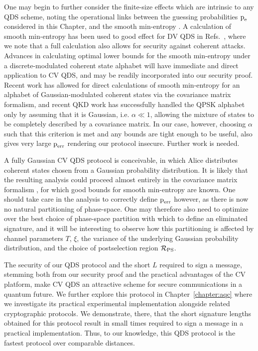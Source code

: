 One may begin to further consider the finite-size effects \cite{Tomamichel2016} which are intrinsic to any QDS scheme, noting the operational links between the guessing probabilities $\text{p}_{\text{e}}$ considered in this Chapter, and the smooth min-entropy \cite{Konig2009}. A calculation of smooth min-entropy has been used to good effect for DV QDS in Refs.~\cite{Amiri2016, Puthoor2016}, where we note that a full calculation also allows for security against coherent attacks. Advances in calculating optimal lower bounds for the smooth min-entropy under a discrete-modulated coherent state alphabet will have immediate and direct application to CV QDS, and may be readily incorporated into our security proof. Recent work \cite{Seshadreesan2017} has allowed for direct calculations of smooth min-entropy for an alphabet of Gaussian-modulated coherent states via the covariance matrix formalism, and recent QKD work \cite{Ghorai2019, Lin2019} has successfully handled the QPSK alphabet only by assuming that it is Gaussian, i.e. $\alpha \ll 1$, allowing the mixture of states to be completely described by a covariance matrix. In our case, however, choosing $\alpha$ such that this criterion is met and any bounds are tight enough to be useful, also gives very large $\text{p}_{\text{err}}$ rendering our protocol insecure. Further work is needed.

A fully Gaussian CV QDS protocol is conceivable, in which Alice distributes coherent states chosen from a Gaussian probability distribution. It is likely that the resulting analysis could proceed almost entirely in the covariance matrix formalism \cite{Weedbrook2012, Serafini2018}, for which good bounds for smooth min-entropy are known. One should take care in the analysis to correctly define $\text{p}_{\text{err}}$ however, as there is now no natural partitioning of phase-space. One may therefore also need to optimize over the best choice of phase-space partition with which to define an eliminated signature, and it will be interesting to observe how this partitioning is affected by channel parameters $T$, $\xi$, the variance of the underlying Gaussian probability distribution, and the choice of postselection region $\mathcal{R}_{\text{PS}}$.


The security of our QDS protocol and the short $L$ required to sign a message, stemming both from our security proof and the practical advantages of the CV platform, make CV QDS an attractive scheme for secure communications in a quantum future. We further explore this protocol in Chapter~\ref{chapter:aqc} where we investigate its practical experimental implementation alongside related cryptographic protocols. We demonstrate, there, that the short signature lengths obtained for this protocol result in small times required to sign a message in a practical implementation. Thus, to our knowledge, this QDS protocol is the fastest protocol over comparable distances.

